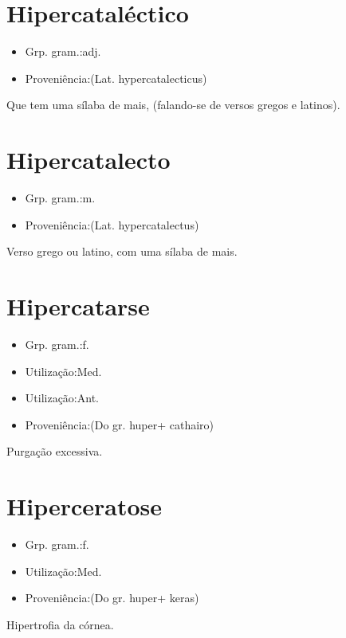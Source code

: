 \documentclass{article}
\begin{document}
\section{Hipercataléctico}
\begin{itemize}
\item {Grp. gram.:adj.}
\end{itemize}
\begin{itemize}
\item {Proveniência:(Lat. \textunderscore hypercatalecticus\textunderscore )}
\end{itemize}
Que tem uma sílaba de mais, (falando-se de versos gregos e latinos).
\section{Hipercatalecto}
\begin{itemize}
\item {Grp. gram.:m.}
\end{itemize}
\begin{itemize}
\item {Proveniência:(Lat. \textunderscore hypercatalectus\textunderscore )}
\end{itemize}
Verso grego ou latino, com uma sílaba de mais.
\section{Hipercatarse}
\begin{itemize}
\item {Grp. gram.:f.}
\end{itemize}
\begin{itemize}
\item {Utilização:Med.}
\end{itemize}
\begin{itemize}
\item {Utilização:Ant.}
\end{itemize}
\begin{itemize}
\item {Proveniência:(Do gr. \textunderscore huper\textunderscore  + \textunderscore cathairo\textunderscore )}
\end{itemize}
Purgação excessiva.
\section{Hiperceratose}
\begin{itemize}
\item {Grp. gram.:f.}
\end{itemize}
\begin{itemize}
\item {Utilização:Med.}
\end{itemize}
\begin{itemize}
\item {Proveniência:(Do gr. \textunderscore huper\textunderscore  + \textunderscore keras\textunderscore )}
\end{itemize}
Hipertrofia da córnea.
\end{document}
